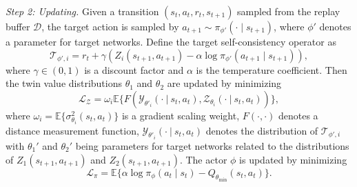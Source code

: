 \documentclass[conference]{IEEEtran}
\begin{document}
\textit{Step 2: Updating.}
Given a transition $(s_t,a_t,r_t,s_{t+1})$ sampled from the replay buffer $\mathcal{D}$, the target action is sampled by
$a_{t+1}\sim \pi_{\phi'}(\cdot\mid s_{t+1})$,
where $\phi'$ denotes a parameter for target networks. 
Define the target self-consistency operator as 
\begin{equation}
\mathcal{T}_{\phi',i}
=
r_t+\gamma\left(
Z_i(s_{t+1},a_{t+1})
-\alpha\log\pi_{\phi'}(a_{t+1}\mid s_{t+1})
\right),
\end{equation}
where $\gamma\in(0,1)$ is a discount factor and $\alpha$ is the temperature coefficient. 
Then the twin value distributions $\theta_1$ and $\theta_2$ are updated by minimizing 
\begin{equation}
\mathcal{L}_{\mathcal{Z}} = \omega_i \mathbb{E}\{F(\mathcal{Y}_{\theta'_i}(\cdot~|~s_t,a_t),\mathcal{Z}_{\theta_i}(\cdot~|~s_t,a_t))\},
\end{equation}
where $\omega_i =\mathbb{E}\{\sigma_{\theta_i}^2(s_t,a_t)\}$ is a gradient scaling weight, $F(\cdot,\cdot)$ denotes a distance measurement function, $\mathcal{Y}_{\theta'_i}(\cdot~|~s_t,a_t)$ denotes the distribution of $\mathcal{T}_{\phi',i}$ with $\theta_1'$ and $\theta_2'$ being parameters for target networks related to the distributions of $Z_1(s_{t+1},a_{t+1})$ and $Z_2(s_{t+1},a_{t+1})$. 
The actor $\phi$ is updated by minimizing 
\begin{equation}
\mathcal{L}_{\pi}
=
\mathbb{E}
\{
\alpha \log \pi_\phi(a_t\mid s_t)
- Q_{\theta_{\min}}(s_t,a_t)\}.
\end{equation}
\end{document}
